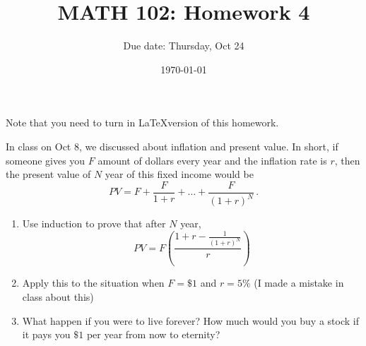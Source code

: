 \documentclass[12pt]{amsart}
\title{ MATH 102: Homework 4}
\author{Due date: Thursday, Oct 24}
\date{\today}
\begin{document}
\maketitle

Note that you need to turn in \LaTeX version of this homework.

\begin{problem}
In class on Oct 8, we discussed about inflation and present value.
In short, if someone gives you $F$ amount of dollars every year
and the inflation rate is $r$, then the present value of $N$ year
of this fixed income would be
\begin{equation*}
	PV = F + \frac{F}{1 + r} + \dots + \frac{F}{(1 + r)^N} \,.
\end{equation*}

\begin{enumerate}
	\item Use induction to prove that after $N$ year,
	      \begin{equation*}
		      PV = F \left(\frac{ 1 + r - \frac{1}{(1+r)^{N}} }{r} \right)
	      \end{equation*}
	\item Apply this to the situation when $F = \$1$ and $r = 5\%$ (I made a mistake in
	      class about this)
	\item What happen if you were to live forever? How much would you buy a stock if
	      it pays you $\$1$ per year from now to eternity?
\end{enumerate}


\end{problem}






\printbibliography
%
%
\end{document}
